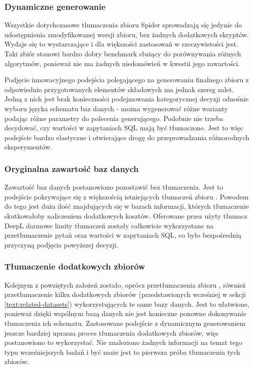 \subsubsection{Dynamiczne generowanie}
Wszystkie dotychczasowe tłumaczenia zbioru Spider sprowadzają się jedynie do udostępnienia zmodyfikowanej wersji zbioru, bez żadnych dodatkowych skryptów. Wydaje się to wystarczające i dla większości zastosowań w rzeczywistości jest. Taki zbiór stanowi bardzo dobry benchmark służący do porównywania różnych algorytmów, ponieważ nie ma żadnych niedomówień w kwestii jego zawartości.

Podjęcie innowacyjnego podejścia polegającego na generowaniu finalnego zbioru z odpowiednio przygotowanych elementów składowych ma jednak szereg zalet. Jedną z nich jest brak konieczności podejmowania kategorycznej decyzji odnośnie wyboru języka schematu baz danych - można wygenerować różne warianty podając różne parametry do polecenia generującego. Podobnie nie trzeba decydować, czy wartości w zapytaniach SQL mają być tłumaczone. Jest to więc podejście bardzo elastyczne i otwierające drogę do przeprowadzania różnorodnych eksperymentów.

\subsubsection{Oryginalna zawartość baz danych}
Zawartość baz danych postanowiono pozostawić bez tłumaczenia. Jest to podejście pokrywające się z większością istniejących tłumaczeń zbioru . Powodem do tego jest duża ilość znajdujących się w bazach informacji, których tłumaczenie skutkowałoby naliczeniem dodatkowych kosztów. Oferowane przez użyty tłumacz DeepL darmowe limity tłumaczeń zostały całkowicie wykorzystane na przetłumaczenie pytań oraz wartości w zapytaniach SQL, co było bezpośrednią przyczyną podjęcia powyższej decyzji.

\subsubsection{Tłumaczenie dodatkowych zbiorów}
Kolejnym z powziętych założeń zostało, oprócz przetłumaczenia zbioru , również przetłumaczenie kilku dodatkowych zbiorów (przedstawionych wcześniej w sekcji \ref{text:related-datasets}) wykorzystujących te same bazy danych. Jest to ułatwione, ponieważ dzięki wspólnym bazą danych nie jest konieczne ponowne dokonywanie tłumaczenia ich schematu. Zastosowane podejście z dynamicznym generowaniem jeszcze bardziej uprasza proces tłumaczenia dodatkowych zbiorów, więc postanowiono to wykorzystać. Nie znaleziono żadnych informacji na temat tego typu wcześniejszych badań i być może jest to pierwsza próba tłumaczenia tych zbiorów.

